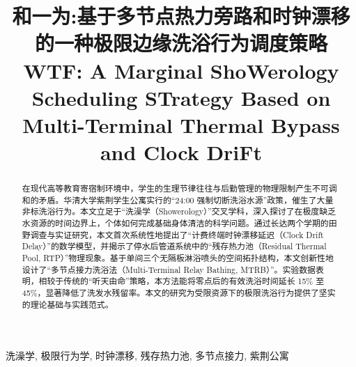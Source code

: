 ﻿\documentclass[10pt, conference, a4paper]{IEEEtran}
\begin{document}
\title{\textbf{和一为}:基于多节点热力旁路\textbf{和}时钟漂移的\textbf{一}种极限边缘洗浴行\textbf{为}调度策略\\
\Large \textbf{WTF}: A Marginal Sho\textbf{W}erology Scheduling S\textbf{T}rategy Based on Multi-Terminal Thermal Bypass and Clock Dri\textbf{F}t}

\author{
\and
{}
\and
{}
}

\maketitle

\begin{abstract}
在现代高等教育寄宿制环境中，学生的生理节律往往与后勤管理的物理限制产生不可调和的矛盾。华清大学紫荆学生公寓实行的“24:00 强制切断洗浴水源”政策，催生了大量非标洗浴行为。本文立足于“洗澡学（Showerology）”交叉学科，深入探讨了在极度缺乏水资源的时间边界上，个体如何完成基础身体清洁的科学问题。通过长达两个学期的田野调查与实证研究，本文首次系统性地提出了“计费终端时钟漂移延迟（Clock Drift Delay）”的数学模型，并揭示了停水后管道系统中的“残存热力池（Residual Thermal Pool, RTP）”物理现象。基于单间三个无隔板淋浴喷头的空间拓扑结构，本文创新性地设计了“多节点接力洗浴法（Multi-Terminal Relay Bathing, MTRB）”。实验数据表明，相较于传统的“听天由命”策略，本方法能将零点后的有效洗浴时间延长 15\% 至 45\%，显著降低了洗发水残留率。本文的研究为受限资源下的极限洗浴行为提供了坚实的理论基础与实践范式。
\end{abstract}

\begin{IEEEkeywords}
洗澡学, 极限行为学, 时钟漂移, 残存热力池, 多节点接力, 紫荆公寓
\end{IEEEkeywords}
\end{document}
